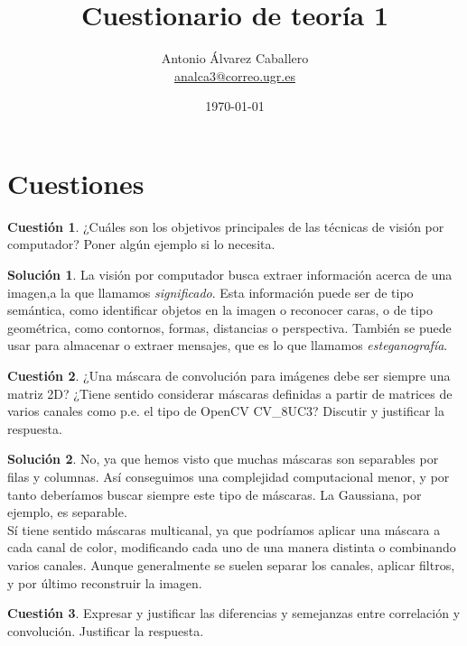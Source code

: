 \documentclass[a4paper, 11pt]{article}
\title{Cuestionario de teoría 1}
\author{Antonio Álvarez Caballero\\
       \href{mailto:analca3@correo.ugr.es}{analca3@correo.ugr.es}}
\date{\today}
\theoremstyle{definition}
\newtheorem{cuestion}{Cuestión}
\newtheorem*{solucion}{Solución}
\begin{document}
  \maketitle

  \section{Cuestiones}

  \begin{cuestion}
      ¿Cuáles son los objetivos principales de las técnicas de visión por computador? Poner algún ejemplo si lo necesita.
  \end{cuestion}

  \begin{solucion}
    La visión por computador busca extraer información acerca de una imagen,a la
    que llamamos \textit{significado}.
    Esta información puede ser de tipo semántica, como identificar objetos en
    la imagen o reconocer caras, o de tipo geométrica, como contornos, formas, distancias
    o perspectiva. También se puede usar para almacenar o extraer mensajes,
    que es lo que llamamos \textit{esteganografía}.
  \end{solucion}

  \begin{cuestion}
      ¿Una máscara de convolución para imágenes debe ser siempre una matriz 2D?
       ¿Tiene sentido considerar máscaras definidas a partir de matrices de varios
        canales como p.e. el tipo de OpenCV CV\_8UC3? Discutir y justificar la respuesta.
  \end{cuestion}

  \begin{solucion}
      No, ya que hemos visto que muchas máscaras son separables por filas y columnas.
      Así conseguimos una complejidad computacional menor, y por tanto deberíamos
      buscar siempre este tipo de máscaras. La Gaussiana, por ejemplo, es separable. \\

      Sí tiene sentido máscaras multicanal, ya que podríamos aplicar una máscara
      a cada canal de color, modificando cada uno de una manera distinta o combinando
      varios canales. Aunque generalmente se suelen separar los canales, aplicar filtros,
      y por último reconstruir la imagen.
  \end{solucion}

  \begin{cuestion}
      Expresar y justificar las diferencias y semejanzas entre correlación
      y convolución. Justificar la respuesta.
  \end{cuestion}
\end{document}
